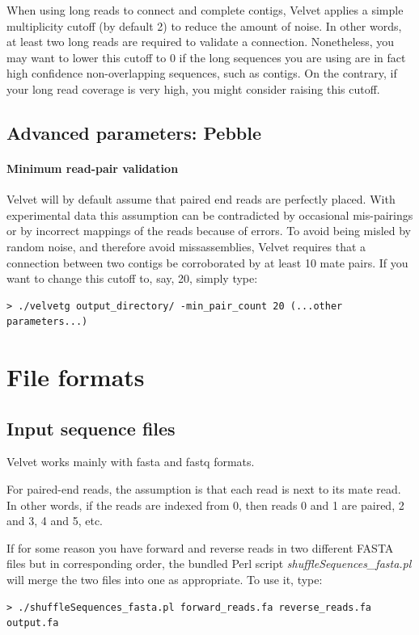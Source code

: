 \documentclass{article}
\begin{document}
When using long reads to connect and complete contigs, Velvet applies a simple multiplicity cutoff (by default 2) to reduce the amount of noise. In other words, at least two long reads are required to validate a connection. Nonetheless, you may want to lower this cutoff to 0 if the long sequences you are using are in fact high confidence non-overlapping sequences, such as contigs. On the contrary, if your long read coverage is very high, you might consider raising this cutoff.

\subsection{Advanced parameters: Pebble}

\paragraph{Minimum read-pair validation}

Velvet will by default assume that paired end reads are perfectly placed. With experimental data this assumption can be contradicted by occasional mis-pairings or by incorrect mappings of the reads because of errors. To avoid being misled by random noise, and therefore avoid missassemblies, Velvet requires that a connection between two contigs be corroborated by at least 10 mate pairs. If you want to change this cutoff to, say, 20, simply type:

\begin{verbatim}
> ./velvetg output_directory/ -min_pair_count 20 (...other parameters...)
\end{verbatim}  

\section{File formats}

\subsection{Input sequence files}

\label{sec:pairedformat}

Velvet works mainly with fasta and fastq formats. 

For paired-end reads, the assumption is that each read is next to its mate
read. In other words, if the reads are indexed from 0, then reads 0 and 1 are
paired, 2 and 3, 4 and 5, etc.  

If for some reason you have forward and reverse reads in two different FASTA files
but in corresponding order, the bundled Perl script \emph{shuffleSequences\_fasta.pl} will
merge the two files into one as appropriate. To use it, type:
\begin{verbatim}
> ./shuffleSequences_fasta.pl forward_reads.fa reverse_reads.fa output.fa
\end{verbatim}
\end{document}
